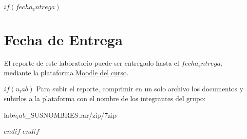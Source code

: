 $if(fecha_entrega)$
	\section*{Fecha de Entrega}
	El reporte de este laboratorio puede ser entregado hasta el $fecha_entrega$, mediante la plataforma 
	{\color{greenPortada} \href{https://uvirtual.usach.cl/moodle/course/view.php?id=25457}{Moodle del curso}}.
	
	$if(n_lab)$
		Para subir el reporte, comprimir en un solo archivo los documentos y subirlos a la plataforma con el nombre de los integrantes del grupo:
		\begin{center}
			lab$n_lab$\_SUSNOMBRES.rar/zip/7zip
		\end{center}
	$endif$
$endif$